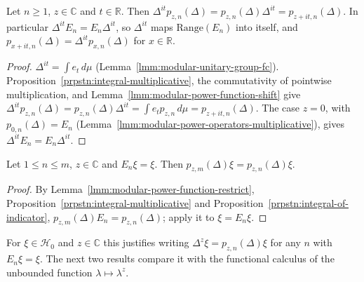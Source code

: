 \begin{lemma}
    \label{lmm:modular-power-unitary-group}
    \leanok
    Let $n \ge 1$, $z \in \mathbb{C}$ and $t \in \mathbb{R}$. Then $\Delta^{it}p_{z,n}(\Delta) = p_{z,n}(\Delta)\Delta^{it} = p_{z+it,n}(\Delta)$. In particular $\Delta^{it}E_n = E_n\Delta^{it}$, so $\Delta^{it}$ maps $\text{Range}(E_n)$ into itself, and $p_{x+it,n}(\Delta) = \Delta^{it}p_{x,n}(\Delta)$ for $x \in \mathbb{R}$.
\end{lemma}
\begin{proof}
    \leanok
    $\Delta^{it} = \int e_t \, d\mu$ (Lemma~\ref{lmm:modular-unitary-group-fc}). Proposition~\ref{prpstn:integral-multiplicative}, the commutativity of pointwise multiplication, and Lemma~\ref{lmm:modular-power-function-shift} give $\Delta^{it}p_{z,n}(\Delta) = p_{z,n}(\Delta)\Delta^{it} = \int e_tp_{z,n} \, d\mu = p_{z+it,n}(\Delta)$. The case $z = 0$, with $p_{0,n}(\Delta) = E_n$ (Lemma~\ref{lmm:modular-power-operators-multiplicative}), gives $\Delta^{it}E_n = E_n\Delta^{it}$.
\end{proof}

\begin{lemma}
    \label{lmm:modular-power-consistent}
    \leanok
    Let $1 \le n \le m$, $z \in \mathbb{C}$ and $E_n\xi = \xi$. Then $p_{z,m}(\Delta)\xi = p_{z,n}(\Delta)\xi$.
\end{lemma}
\begin{proof}
    \leanok
    By Lemma~\ref{lmm:modular-power-function-restrict}, Proposition~\ref{prpstn:integral-multiplicative} and Proposition~\ref{prpstn:integral-of-indicator}, $p_{z,m}(\Delta)E_n = p_{z,n}(\Delta)$; apply it to $\xi = E_n\xi$.
\end{proof}

For $\xi \in \mathcal{H}_0$ and $z \in \mathbb{C}$ this justifies writing $\Delta^z\xi = p_{z,n}(\Delta)\xi$ for any $n$ with $E_n\xi = \xi$. The next two results compare it with the functional calculus of the unbounded function $\lambda \mapsto \lambda^z$.

